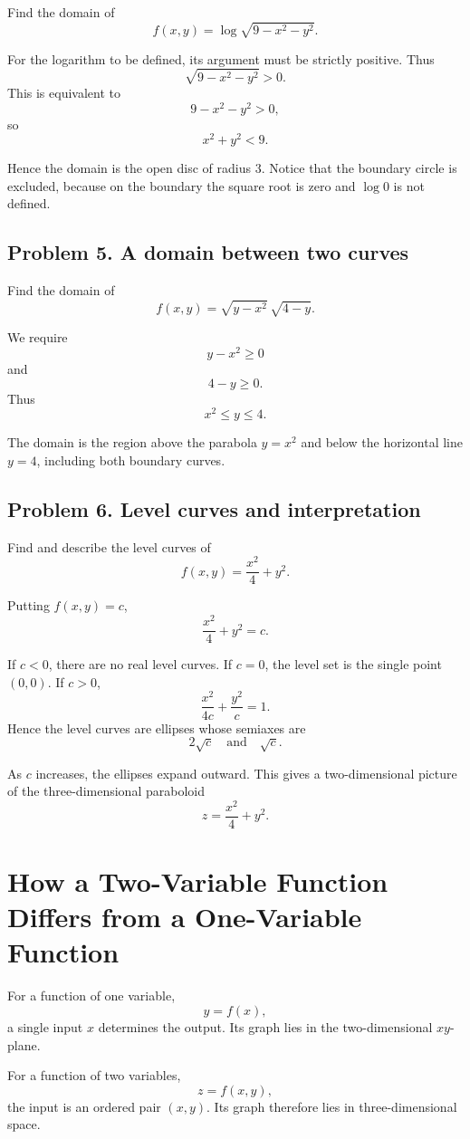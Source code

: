 \documentclass[11pt,oneside]{book}
\theoremstyle{studentthm}
\theoremstyle{definition}
\begin{document}
Find the domain of
\[
f(x,y)=\log\!\sqrt{9-x^2-y^2}.
\]

For the logarithm to be defined, its argument must be strictly positive.
Thus
\[
\sqrt{9-x^2-y^2}>0.
\]
This is equivalent to
\[
9-x^2-y^2>0,
\]
so
\[
x^2+y^2<9.
\]

Hence the domain is the open disc of radius \(3\). Notice that the
boundary circle is excluded, because on the boundary the square root is
zero and \(\log0\) is not defined.

\subsection*{Problem 5. A domain between two curves}

Find the domain of
\[
f(x,y)=\sqrt{y-x^2}\,\sqrt{4-y}.
\]

We require
\[
y-x^2\ge0
\]
and
\[
4-y\ge0.
\]
Thus
\[
x^2\le y\le4.
\]

The domain is the region above the parabola \(y=x^2\) and below the
horizontal line \(y=4\), including both boundary curves.

\subsection*{Problem 6. Level curves and interpretation}

Find and describe the level curves of
\[
f(x,y)=\frac{x^2}{4}+y^2.
\]

Putting \(f(x,y)=c\),
\[
\frac{x^2}{4}+y^2=c.
\]

If \(c<0\), there are no real level curves. If \(c=0\), the level set is
the single point \((0,0)\). If \(c>0\),
\[
\frac{x^2}{4c}+\frac{y^2}{c}=1.
\]
Hence the level curves are ellipses whose semiaxes are
\[
2\sqrt c
\quad\text{and}\quad
\sqrt c.
\]

As \(c\) increases, the ellipses expand outward. This gives a
two-dimensional picture of the three-dimensional paraboloid
\[
z=\frac{x^2}{4}+y^2.
\]



\section{How a Two-Variable Function Differs from a One-Variable Function}

For a function of one variable,
\[
y=f(x),
\]
a single input \(x\) determines the output. Its graph lies in the
two-dimensional \(xy\)-plane.

For a function of two variables,
\[
z=f(x,y),
\]
the input is an ordered pair \((x,y)\). Its graph therefore lies in
three-dimensional space.
\end{document}
